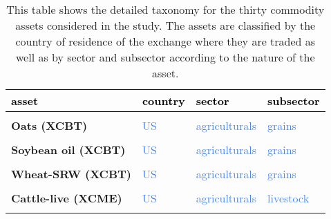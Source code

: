 \documentclass[
  authoryear,
  preprint,
  3p]{elsarticle}
\begin{document}
\begin{longtable}[t]{>{}l>{}l>{}l>{}l}

\caption{\label{tbl-assets-taxonomy}This table shows the detailed
taxonomy for the thirty commodity assets considered in the study. The
assets are classified by the country of residence of the exchange where
they are traded as well as by sector and subsector according to the
nature of the asset.}

\tabularnewline

\toprule
\textcolor{black}{\textbf{asset}} & \textcolor{black}{\textbf{country}} & \textcolor{black}{\textbf{sector}} & \textcolor{black}{\textbf{subsector}}\\
\midrule
\textbf{\cellcolor{gray!10}{Corn-\#2 yellow (XCBT)}} & \textcolor[HTML]{4285f4}{\cellcolor{gray!10}{US}} & \textcolor[HTML]{4285f4}{\cellcolor{gray!10}{agriculturals}} & \textcolor[HTML]{4285f4}{\cellcolor{gray!10}{grains}}\\
\textbf{Oats (XCBT)} & \textcolor[HTML]{4285f4}{US} & \textcolor[HTML]{4285f4}{agriculturals} & \textcolor[HTML]{4285f4}{grains}\\
\textbf{\cellcolor{gray!10}{Soybean meal (XCBT)}} & \textcolor[HTML]{4285f4}{\cellcolor{gray!10}{US}} & \textcolor[HTML]{4285f4}{\cellcolor{gray!10}{agriculturals}} & \textcolor[HTML]{4285f4}{\cellcolor{gray!10}{grains}}\\
\textbf{Soybean oil (XCBT)} & \textcolor[HTML]{4285f4}{US} & \textcolor[HTML]{4285f4}{agriculturals} & \textcolor[HTML]{4285f4}{grains}\\
\textbf{\cellcolor{gray!10}{Soybeans (XCBT)}} & \textcolor[HTML]{4285f4}{\cellcolor{gray!10}{US}} & \textcolor[HTML]{4285f4}{\cellcolor{gray!10}{agriculturals}} & \textcolor[HTML]{4285f4}{\cellcolor{gray!10}{grains}}\\
\addlinespace
\textbf{Wheat-SRW (XCBT)} & \textcolor[HTML]{4285f4}{US} & \textcolor[HTML]{4285f4}{agriculturals} & \textcolor[HTML]{4285f4}{grains}\\
\textbf{\cellcolor{gray!10}{Cattle-feeder (XCME)}} & \textcolor[HTML]{4285f4}{\cellcolor{gray!10}{US}} & \textcolor[HTML]{4285f4}{\cellcolor{gray!10}{agriculturals}} & \textcolor[HTML]{4285f4}{\cellcolor{gray!10}{livestock}}\\
\textbf{Cattle-live (XCME)} & \textcolor[HTML]{4285f4}{US} & \textcolor[HTML]{4285f4}{agriculturals} & \textcolor[HTML]{4285f4}{livestock}\\
\textbf{\cellcolor{gray!10}{Lean hogs (XCME)}} & \textcolor[HTML]{4285f4}{\cellcolor{gray!10}{US}} & \textcolor[HTML]{4285f4}{\cellcolor{gray!10}{agriculturals}} & \textcolor[HTML]{4285f4}{\cellcolor{gray!10}{livestock}}\\

\end{longtable}
\end{document}
